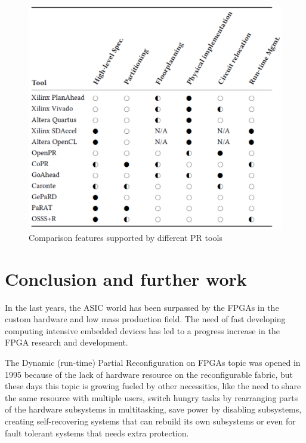 \documentclass[twoside]{romjist}
\begin{document}
	\begin{figure}[!htbp]
		\centering
		\includegraphics[width=\textwidth]{fig_4_1}
		\caption{Comparison features supported by different PR tools \cite{2}}
		\label{fig:figure41}
	\end{figure}
	\FloatBarrier
	
	\section{Conclusion and further work}
	\hspace{0.5cm}In the last years, the ASIC world has been surpassed by the FPGAs in the custom hardware
	and low mass production field. The need of fast developing computing intensive embedded
	devices has led to a progress increase in the FPGA research and development.
	
	
	\hspace{0.5cm}The Dynamic (run-time) Partial Reconfiguration on FPGAs topic was opened in 1995 because
	of the lack of hardware resource on the reconfigurable fabric, but these days this topic is
	growing fueled by other necessities, like the need to share the same resource with multiple
	users, switch hungry tasks by rearranging parts of the hardware subsystems in multitasking,
	save power by disabling subsystems, creating self-recovering systems that can rebuild its own
	subsystems or even for fault tolerant systems that needs extra protection.
	
\end{document}
